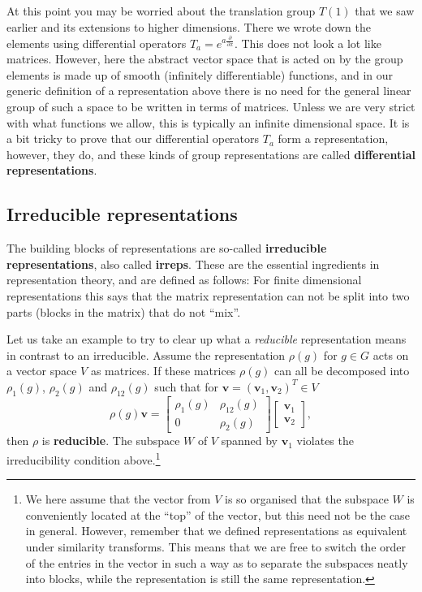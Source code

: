 \documentclass[notes.tex]{subfiles}
\begin{document}
At this point you may be worried about the translation group $T(1)$ that we saw earlier and its extensions to higher dimensions. There we wrote down the elements using differential operators $T_a=e^{a\frac{\partial}{\partial x}}$. This does not look a lot like matrices. However, here the abstract vector space that is acted on by the group elements is made up of smooth (infinitely differentiable) functions, and in our generic definition of a representation above there is no need for the general linear group of such a space to be written in terms of matrices. Unless we are very strict with what functions we allow, this is typically an infinite dimensional space. It is a bit tricky to prove that our differential operators $T_a$ form a representation, however, they do, and these kinds of group representations are called {\bf differential representations}.



\subsection{Irreducible representations}
\label{sec:irreps}
The building blocks of representations are so-called {\bf irreducible representations}, also called {\bf irreps}. These are the essential ingredients in representation theory, and are defined as follows: 
For finite dimensional representations this says that the matrix representation can not be split into two parts (blocks in the matrix) that do not  ``mix''.

Let us take an example to try to clear up what a {\it reducible} representation means in contrast to an irreducible. Assume the representation $\rho(g)$ for $g \in G$ acts on a vector space $V$ as matrices. If these matrices $\rho(g)$ can all be decomposed into $\rho_1(g)$, $\rho_2(g)$ and $\rho_{12}(g)$ such that for $\mathbf v =(\mathbf v_1, \mathbf v_2)^T\in V$ 
\[\rho(g) \mathbf v = \begin{bmatrix}\rho_1(g) & \rho_{12}(g) \\ 0 & \rho_2(g)\end{bmatrix} \begin{bmatrix}\mathbf v_1 \\ \mathbf v_2 \end{bmatrix}  ,\]
then $\rho$ is {\bf reducible}. The subspace $W$ of $V$ spanned by $\mathbf v_1$ violates the irreducibility condition above.\footnote{We here assume that the vector from $V$ is so organised that the subspace $W$ is conveniently located at the ``top'' of the vector, but this need not be the case in general. However, remember that we defined representations as equivalent under similarity transforms. This means that we are free to switch the order of the entries in the vector in such a way as to separate the subspaces neatly into blocks, while the representation is still the same representation.}
\end{document}

